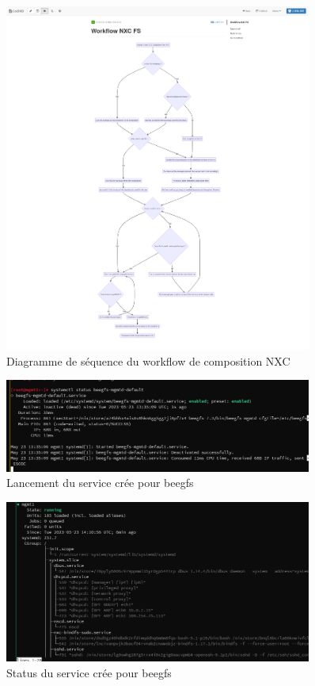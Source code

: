 \documentclass[a4paper,french,12pt, titlepage]{article}
\begin{document}
\begin{figure}
\centering
\includegraphics[width=0.9\textwidth,height=0.9\textheight,keepaspectratio]{annexe/workflowpre.png}
\caption{Diagramme de séquence du workflow de composition NXC}
\end{figure}

\begin{figure}
\centering
\includegraphics[width=0.9\textwidth,height=0.9\textheight,keepaspectratio]{annexe/beegfs_service.png}
\caption{Lancement du service crée pour beegfs}
\end{figure}

\begin{figure}
\centering
\includegraphics[width=0.9\textwidth,height=0.9\textheight,keepaspectratio]{annexe/beegfs_service_yes.png}
\caption{Status du service crée pour beegfs}
\end{figure}
\end{document}
